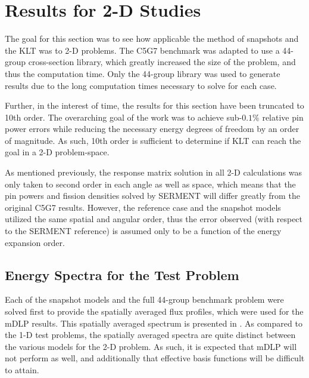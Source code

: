 
\chapter{Results for 2-D Studies} %

\label{Chapter6} %


The goal for this section was to see how applicable the method of snapshots and 
the KLT was to 2-D problems.  The C5G7 benchmark was adapted to use a 44-group 
cross-section library, which greatly increased the size of the problem, and 
thus the computation time.  Only the 44-group library was used to generate 
results due to the long computation times necessary to solve for each case.  

Further, in the interest of time, the results for this section have been 
truncated to 10th order.  The overarching goal of the work was to achieve 
sub-$0.1\%$ relative pin 
power errors while reducing the necessary energy degrees of freedom by an order 
of magnitude.  As such, 10th order is sufficient to determine if KLT can reach 
the goal in a 2-D problem-space.

As mentioned previously, the response matrix solution in all 2-D calculations 
was only taken to second order in each angle as well as space, which means that 
the pin powers and fission densities solved by SERMENT will differ 
greatly from the original C5G7 results.  However, the reference case and the 
snapshot models utilized the same spatial and angular order, thus the error 
observed (with respect to the SERMENT reference) is assumed only to be a 
function of the energy expansion order.

\section{Energy Spectra for the Test Problem}

Each of the snapshot models and the full 44-group benchmark problem were solved 
first to provide the spatially averaged flux profiles, which were used for the 
mDLP results.  This spatially averaged spectrum is presented in 
.  As compared to the 1-D test problems, the spatially 
averaged spectra are quite distinct between the various models for the 2-D 
problem.  As such, it is expected that mDLP will not perform as well, and 
additionally that effective basis functions will be difficult to attain.


